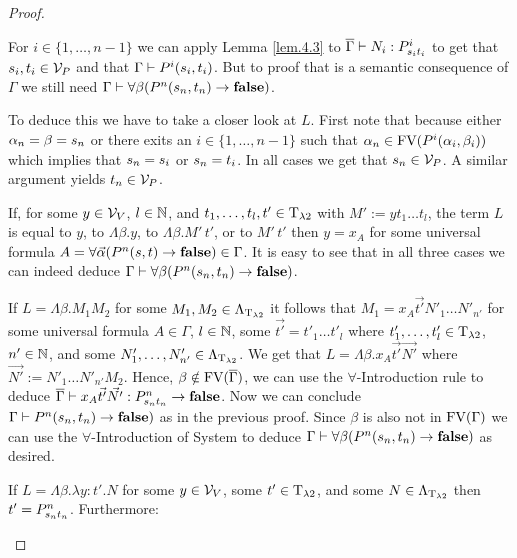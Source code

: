 \begin{proof}
\begin{itemize}
		\begin{figure}[H]
			\centering
			
		\end{figure}
		
		For $i\in\{1,\dots,n-1\}$ we can apply Lemma \ref{lem.4.3} to $\trans{\Gamma}\lambdaModels N_i:\code{P^i}{\predTFst[i]}{\predTSnd[i]}$ to get that $\predTFst[i],\predTSnd[i]\in\VarP$ and that $\Gamma\PModels P^i(\predTFst[i],\predTSnd[i])$. But to proof that \false{} is a semantic consequence of $\Gamma$ we still need $\Gamma\PModels\forall\beta(P^n(\predTFst[n],\predTSnd[n])\to\false)$.
		
		To deduce this we have to take a closer look at $L$. First note that because either $\predFst[n]=\beta=\predTFst[n]$ or there exits an $i\in\{1,\dots,n-1\}$ such that $\predFst[n]\in\FV(P^i(\predFst[i],\predSnd[i]))$ which implies that $\predTFst[n]=\predTFst[i]$ or $\predTFst[n]=\predTSnd[i]$. In all cases we get that $\predTFst[n]\in\VarP$. A similar argument yields $\predTSnd[n]\in\VarP$.
		
		If, for some $y\in\mathcal{V}_V$, $l\in\mathbb{N}$, and $t_1,\dots,t_l,t'\in\text{T}_{\lambda2}$ with $M':=yt_1\dots t_l$, the term $L$ is equal to $y$, to $\Lambda\beta.y$, to $\Lambda\beta.M'\,t'$, or to $M'\,t'$ then $y=x_A$ for some universal formula $A=\forall\vec{\alpha}(P^n(\predTFst,\predTSnd)\to\false)\in\Gamma$. It is easy to see that in all three cases we can indeed deduce $\Gamma\PModels\forall\beta(P^n(\predTFst[n],\predTSnd[n])\to\false)$.
		
		If $L=\Lambda\beta.M_1M_2$ for some $M_1,M_2\in\Lambda_{\text{T}_{\lambda2}}$ it follows that $M_1=x_A\vec{t'}N'_1\dots N'_{n'}$ for some universal formula $A\in\Gamma$, $l\in\mathbb{N}$, some $\vec{t'}=t'_1\dots t'_l$ where $t'_1,\dots,t'_l\in\text{T}_{\lambda2}$, $n'\in\mathbb{N}$, and some $N'_1,\dots,N'_{n'}\in\Lambda_{\text{T}_{\lambda2}}$. We get that $L=\Lambda\beta.x_A\vec{t'}\vec{N'}$ where $\vec{N'}:=N'_1\dots N'_{n'}M_2$. Hence,  $\beta\notin\text{FV}(\overline{\Gamma})$, we can use the $\forall$-Introduction rule to deduce $\trans{\Gamma}\lambdaModels x_A\vec{t'}\vec{N'}:\code{P^n}{\predTFst[n]}{\predTSnd[n]}\to\false$. Now we can conclude $\Gamma\PModels P^n(\predTFst[n],\predTSnd[n])\to\false)$ as in the previous proof. %
		Since $\beta$ is also not in $\text{FV}(\Gamma)$ we can use the $\forall$-Introduction of System \SysP{} to deduce $\Gamma\PModels\forall\beta(P^n(\predTFst[n],\predTSnd[n])\to\false)$ as desired.
		
		If $L=\Lambda\beta.\lambda y:t'.N$ for some $y\in\mathcal{V}_V$, some $t'\in\text{T}_{\lambda2}$, and some $N\in\Lambda_{\text{T}_{\lambda2}}$ then $t'=\code{P^n}{\predTFst[n]}{\predTSnd[n]}$. Furthermore:
		

\end{itemize}
\end{proof}
